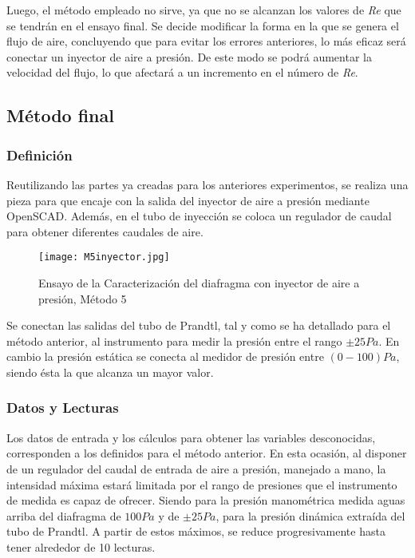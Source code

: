 Luego, el método empleado no sirve, ya que no se alcanzan los valores de
\emph{Re} que se tendrán en el ensayo final. Se decide modificar la
forma en la que se genera el flujo de aire, concluyendo que para evitar
los errores anteriores, lo más eficaz será conectar un inyector de aire
a presión. De este modo se podrá aumentar la velocidad del flujo, lo que
afectará a un incremento en el número de \emph{Re}.

\subsection{Método final}\label{header-n453}

\subsubsection{Definición}\label{header-n454}

Reutilizando las partes ya creadas para los anteriores experimentos, se
realiza una pieza para que encaje con la salida del inyector de aire a
presión mediante OpenSCAD. Además, en el tubo de inyección se coloca un
regulador de caudal para obtener diferentes caudales de aire.

\begin{figure}
\centering
\texttt{[image: M5inyector.jpg]}
\caption[Caracterización del diafragma con inyector de aire a presión]{Ensayo de la Caracterización del diafragma con inyector de aire a presión, Método 5}
\label{fig:M5inyector}
\end{figure}

Se conectan las salidas del tubo de Prandtl, tal y como se ha detallado
para el método anterior, al instrumento para medir la presión entre el
rango \(\pm 25Pa\). En cambio la presión estática se conecta al medidor
de presión entre \((0-100)Pa\), siendo ésta la que alcanza un mayor
valor.

\subsubsection{Datos y Lecturas}\label{header-n467}

Los datos de entrada y los cálculos para obtener las variables
desconocidas, corresponden a los definidos para el método anterior. En
esta ocasión, al disponer de un regulador del caudal de entrada de aire
a presión, manejado a mano, la intensidad máxima estará limitada por el
rango de presiones que el instrumento de medida es capaz de ofrecer.
Siendo para la presión manométrica medida aguas arriba del diafragma de
\(100Pa\) y de \(\pm 25 Pa\), para la presión dinámica extraída del tubo
de Prandtl. A partir de estos máximos, se reduce progresivamente hasta
tener alrededor de 10 lecturas.


